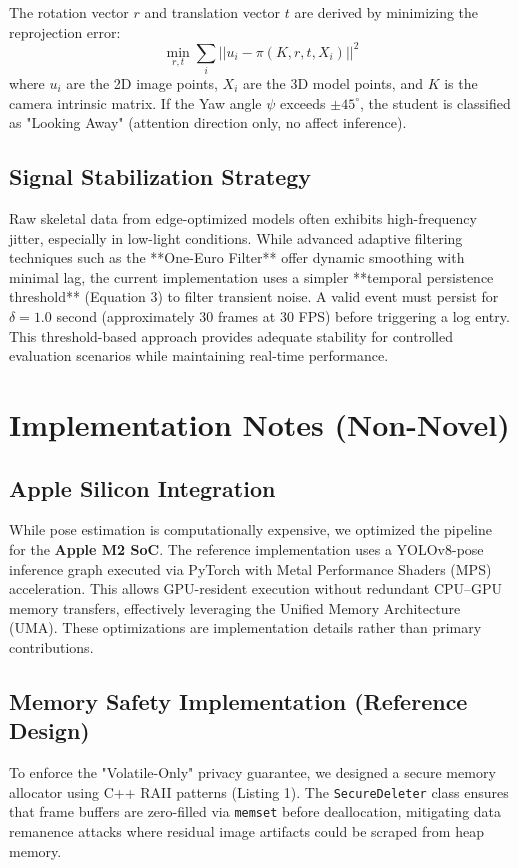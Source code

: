 \documentclass[conference]{IEEEtran}
\begin{document}
The rotation vector $r$ and translation vector $t$ are derived by minimizing the reprojection error:
\begin{equation}
\min_{r, t} \sum_{i} || u_i - \pi(K, r, t, X_i) ||^2
\end{equation}
where $u_i$ are the 2D image points, $X_i$ are the 3D model points, and $K$ is the camera intrinsic matrix. If the Yaw angle $\psi$ exceeds $\pm 45^{\circ}$, the student is classified as "Looking Away" (attention direction only, no affect inference).

\subsection{Signal Stabilization Strategy}
Raw skeletal data from edge-optimized models often exhibits high-frequency jitter, especially in low-light conditions. While advanced adaptive filtering techniques such as the **One-Euro Filter** \cite{b8} offer dynamic smoothing with minimal lag, the current implementation uses a simpler **temporal persistence threshold** (Equation 3) to filter transient noise. A valid event must persist for $\delta = 1.0$ second (approximately 30 frames at 30 FPS) before triggering a log entry. This threshold-based approach provides adequate stability for controlled evaluation scenarios while maintaining real-time performance. 

\section{Implementation Notes (Non-Novel)}

\subsection{Apple Silicon Integration}
While pose estimation is computationally expensive, we optimized the pipeline for the \textbf{Apple M2 SoC}. The reference implementation uses a YOLOv8-pose inference graph executed via PyTorch with Metal Performance Shaders (MPS) acceleration. This allows GPU-resident execution without redundant CPU–GPU memory transfers, effectively leveraging the Unified Memory Architecture (UMA). These optimizations are implementation details rather than primary contributions.

\subsection{Memory Safety Implementation (Reference Design)}
To enforce the "Volatile-Only" privacy guarantee, we designed a secure memory allocator using C++ RAII patterns (Listing 1). The \texttt{SecureDeleter} class ensures that frame buffers are zero-filled via \texttt{memset} before deallocation, mitigating data remanence attacks where residual image artifacts could be scraped from heap memory.
\end{document}
